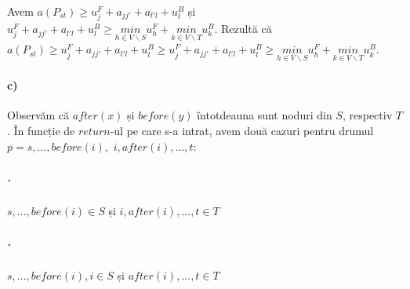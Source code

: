 \documentclass[paper=a4, fontsize=12pt]{scrartcl}
\begin{document}
Avem $a(P_{st}) \geq u^F_j + a_{jj'} + a_{l'l} + u^B_l$ și 
$u^F_j + a_{jj'} + a_{l'l} + u^B_l \geq \underset{h \in V \backslash S}{min} u^F_h + \underset{k \in V \backslash T}{min} u^B_k$.
Rezultă că $a(P_{st}) \geq u^F_j + a_{jj'} + a_{l'l} + u^B_l \geq u^F_j + a_{jj'} + a_{l'l} + u^B_l \geq \underset{h \in V \backslash S}{min} u^F_h + \underset{k \in V \backslash T}{min} u^B_k$.

\paragraph{c)}
Observăm că $after(x)$ și $before(y)$ întotdeauna sunt noduri din $S$, respectiv $T$.
În funcție de $return$-ul pe care s-a intrat, avem două cazuri pentru drumul $p = s, ..., before(i),$ $i, after(i), ..., t$:
\vspace{-1.3em}
\subparagraph{.}
$s, ..., before(i) \in S$ și $i, after(i), ..., t \in T$
\vspace{-1.3em}
\subparagraph{.}
$s, ..., before(i), i \in S$ și $after(i), ..., t \in T$ 
\end{document}
